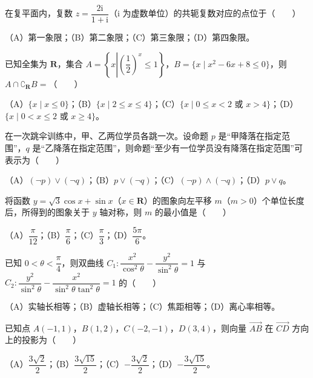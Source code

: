 \begin{question}
在复平面内，复数 $z=\dfrac{2\mathrm i}{1+\mathrm i}$（$\mathrm i$ 为虚数单位）的共轭复数对应的点位于\mbox{（　　）}

（A）第一象限；（B）第二象限；（C）第三象限；（D）第四象限。

\end{question}
\begin{question}
已知全集为 $\mathbf R$，集合 $A=\left\{x\left|\left(\dfrac12\right)^x\leqslant1\right.\right\}$，$B=\{x\mid x^2-6x+8\leqslant0\}$，则 $A\cap\complement_{\mathbf R}B=$\mbox{（　　）}

（A）$\{x\mid x\leqslant0\}$；（B）$\{x\mid2\leqslant x\leqslant4\}$；（C）$\{x\mid0\leqslant x<2$ 或 $x>4\}$；（D）$\{x\mid0<x\leqslant2$ 或 $x\geqslant4\}$。

\end{question}
\begin{question}
在一次跳伞训练中，甲、乙两位学员各跳一次。设命题 $p$ 是“甲降落在指定范围”，$q$ 是“乙降落在指定范围”，则命题“至少有一位学员没有降落在指定范围”可表示为\mbox{（　　）}

（A）$(\neg p)\lor(\neg q)$；（B）$p\lor(\neg q)$；（C）$(\neg p)\land(\neg q)$；（D）$p\lor q$。

\end{question}
\begin{question}
将函数 $y=\sqrt3\cos x+\sin x$（$x\in\mathbf R$）的图象向左平移 $m$（$m>0$）个单位长度后，所得到的图象关于 $y$ 轴对称，则 $m$ 的最小值是\mbox{（　　）}

（A）$\dfrac{\pi}{12}$；（B）$\dfrac{\pi}{6}$；（C）$\dfrac{\pi}{3}$；（D）$\dfrac{5\pi}{6}$。

\end{question}
\begin{question}
已知 $0<\theta<\dfrac{\pi}{4}$，则双曲线 $C_1:\dfrac{x^2}{\cos^2\theta}-\dfrac{y^2}{\sin^2\theta}=1$ 与 $C_2:\dfrac{y^2}{\sin^2\theta}-\dfrac{x^2}{\sin^2\theta\tan^2\theta}=1$ 的\mbox{（　　）}

（A）实轴长相等；（B）虚轴长相等；（C）焦距相等；（D）离心率相等。

\end{question}
\begin{question}
已知点 $A(-1,1)$，$B(1,2)$，$C(-2,-1)$，$D(3,4)$，则向量 $\overrightarrow{AB}$ 在 $\overrightarrow{CD}$ 方向上的投影为\mbox{（　　）}

（A）$\dfrac{3\sqrt2}{2}$；（B）$\dfrac{3\sqrt{15}}{2}$；（C）$-\dfrac{3\sqrt2}{2}$；（D）$-\dfrac{3\sqrt{15}}{2}$。

\end{question}
